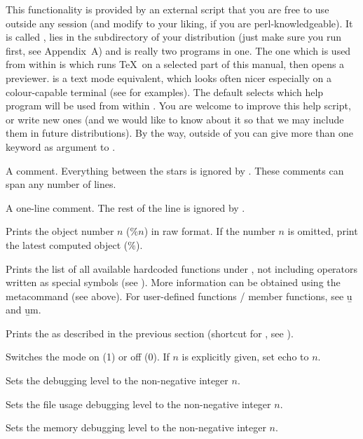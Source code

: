  This functionality is provided by an
external  script that you are free to use outside any  session
(and modify to your liking, if you are perl-knowledgeable). It is called
, lies in the  subdirectory of your distribution
(just make sure you run  first, see Appendix~A) and is
really two programs in one. The one which is used from within  is
 which runs \TeX\ on a selected part of this manual, then opens
a previewer.  is a text mode equivalent, which looks
often nicer especially on a colour-capable terminal (see
 for examples). The default  selects which
help program will be used from within . You are welcome to improve this
help script, or write new ones (and we would like to know about it
so that we may include them in future distributions). By the way, outside
of  you can give more than one keyword as argument to .

 A comment. Everything between the stars is ignored by
. These comments can span any number of lines.

\subseckbd{\bs\bs} A one-line comment. The rest of the line
is ignored by .

 Prints the object number $n$ ($\%n$)
in raw format. If the number $n$ is omitted, print the latest computed object
($\%$). \label{se:history}

 Prints the list of all available
hardcoded functions under , not including operators written as special
symbols (see ). More information can be obtained using
the  metacommand (see above). For user-defined functions / member
functions, see \b{u} and \b{um}.

 Prints the  as described in the
previous section (shortcut for , see ).

 Switches the  mode on (1) or off (0). If
$n$ is explicitly given, set echo to $n$.

 Sets the debugging level  to the
non-negative integer $n$.

 Sets the file usage debugging level 
to the non-negative integer $n$.

 Sets the memory debugging level 
to the non-negative integer $n$.

